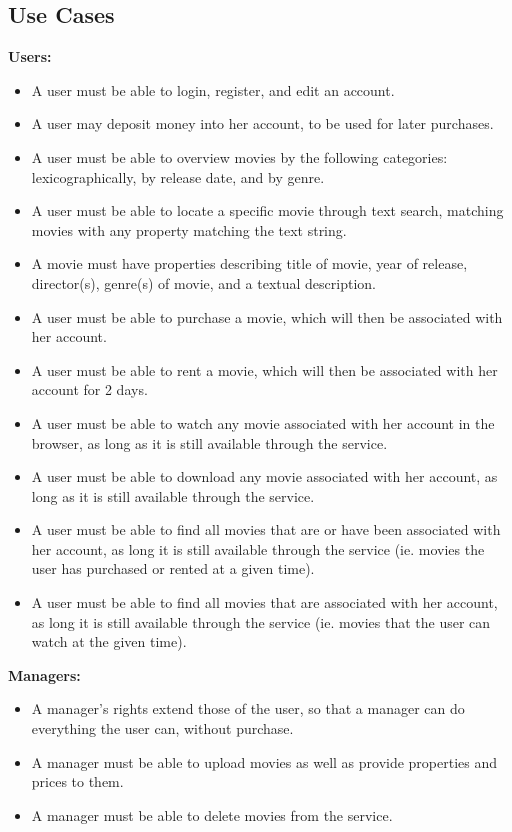 \subsection{Use Cases}
\textbf{Users:}
\begin{itemize}
\item A user must be able to login, register, and edit an account.
\item A user may deposit money into her account, to be used for later purchases.
\item A user must be able to overview movies by the following categories: lexicographically, by release date, and by genre.
\item A user must be able to locate a specific movie through text search, matching movies with any property matching the text string.
\item A movie must have properties describing title of movie, year of release, director(s), genre(s) of movie, and a textual description.
\item A user must be able to purchase a movie, which will then be associated with her account.
\item A user must be able to rent a movie, which will then be associated with her account for 2 days.
\item A user must be able to watch any movie associated with her account in the browser, as long as it is still available through the service.
\item A user must be able to download any movie associated with her account, as long as it is still available through the service.
\item A user must be able to find all movies that are or have been associated with her account, as long it is still available through the service (ie. movies the user has purchased or rented at a given time).
\item A user must be able to find all movies that are associated with her account, as long it is still available through the service (ie. movies that the user can watch at the given time).
\end{itemize}
\textbf{Managers:}
\begin{itemize}
\item A manager's rights extend those of the user, so that a manager can do everything the user can, without purchase.
\item A manager must be able to upload movies as well as provide properties and prices to them.
\item A manager must be able to delete movies from the service.
\end{itemize}